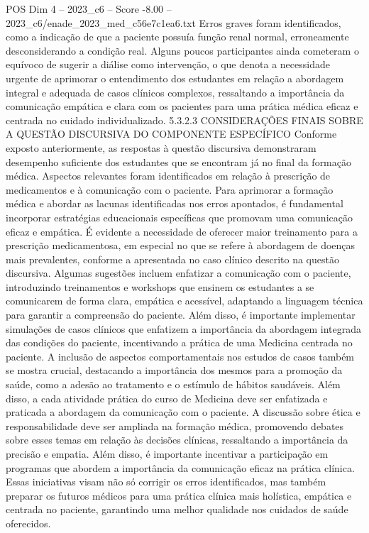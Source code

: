 \begin{textsample}{POS Dim 4 – 2023\_c6 – Score -8.00 – 2023\_c6/enade\_2023\_med\_c56e7c1ea6.txt}
Erros graves foram identificados, como a indicação de que a paciente possuía função renal normal, erroneamente desconsiderando a condição real.
Alguns poucos participantes ainda cometeram o equívoco de sugerir a diálise como intervenção, o que denota a necessidade urgente de aprimorar o entendimento dos estudantes em relação a abordagem integral e adequada de casos clínicos complexos, ressaltando a importância da comunicação empática e clara com os pacientes para uma prática médica eficaz e centrada no cuidado individualizado. 5.3.2.3 CONSIDERAÇÕES FINAIS SOBRE A QUESTÃO DISCURSIVA DO COMPONENTE ESPECÍFICO Conforme exposto anteriormente, as respostas à questão discursiva demonstraram desempenho suficiente dos estudantes que se encontram já no final da formação médica.
Aspectos relevantes foram identificados em relação à prescrição de medicamentos e à comunicação com o paciente.
Para aprimorar a formação médica e abordar as lacunas identificadas nos erros apontados, é fundamental incorporar estratégias educacionais específicas que promovam uma comunicação eficaz e empática.
É evidente a necessidade de oferecer maior treinamento para a prescrição medicamentosa, em especial no que se refere à abordagem de doenças mais prevalentes, conforme a apresentada no caso clínico descrito na questão discursiva.
Algumas sugestões incluem enfatizar a comunicação com o paciente, introduzindo treinamentos e workshops que ensinem os estudantes a se comunicarem de forma clara, empática e acessível, adaptando a linguagem técnica para garantir a compreensão do paciente.
Além disso, é importante implementar simulações de casos clínicos que enfatizem a importância da abordagem integrada das condições do paciente, incentivando a prática de uma Medicina centrada no paciente.
A inclusão de aspectos comportamentais nos estudos de casos também se mostra crucial, destacando a importância dos mesmos para a promoção da saúde, como a adesão ao tratamento e o estímulo de hábitos saudáveis.
Além disso, a cada atividade prática do curso de Medicina deve ser enfatizada e praticada a abordagem da comunicação com o paciente.
A discussão sobre ética e responsabilidade deve ser ampliada na formação médica, promovendo debates sobre esses temas em relação às decisões clínicas, ressaltando a importância da precisão e empatia.
Além disso, é importante incentivar a participação em programas que abordem a importância da comunicação eficaz na prática clínica.
Essas iniciativas visam não só corrigir os erros identificados, mas também preparar os futuros médicos para uma prática clínica mais holística, empática e centrada no paciente, garantindo uma melhor qualidade nos cuidados de saúde oferecidos.

\end{textsample}

